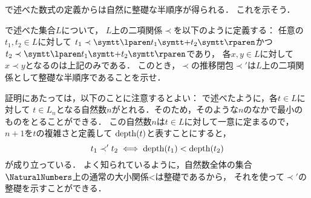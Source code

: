 
\begin{Que} \label{Que:well-foundedexample}
	で述べた数式の定義からは自然に整礎な半順序が得られる．
	これを示そう．

	で述べた集合\(L\)について，
	\(L\)上の二項関係\(\prec\)を以下のように定義する：
	任意の\(t_1, t_2 \in L\)に対して
	\(t_1 \prec \obj{\lparen} t_1 \obj{+} t_2 \obj{\rparen}\)かつ
	\(t_2 \prec \obj{\lparen} t_1 \obj{+} t_2 \obj{\rparen}\)であり，
	各\(x, y \in L\)に対して\(x \prec y\)となるのは上記のみである．
	このとき，\(\prec\)の推移閉包\(\prec'\)は\(L\)上の二項関係として整礎な半順序であることを示せ．

	証明にあたっては，以下のことに注意するとよい：
	で述べたように，各\(t \in L\)に対して
	\(t \in L_{n}\)となる自然数\(n\)がとれる．そのため，そのような\(n\)のなかで最小のものをとることができる．
	この自然数\(n\)は\(t \in L\)に対して一意に定まるので，\(n + 1\)を\(t\)の複雑さと定義して
	\(\apply{\depth}{t}\)と表すことにすると，
	\begin{equation}
		t_1 \prec' t_2 \metaequivalent \apply{\depth}{t_1} < \apply{\depth}{t_2}
		\label{eq:recursivedefinitiondepthorder}
	\end{equation}
	が成り立っている．
	よく知られているように，自然数全体の集合\(\NaturalNumbers\)上の通常の大小関係\(\mathord{<}\)は整礎であるから，
	それを使って\(\prec'\)の整礎を示すことができる．
\end{Que}

